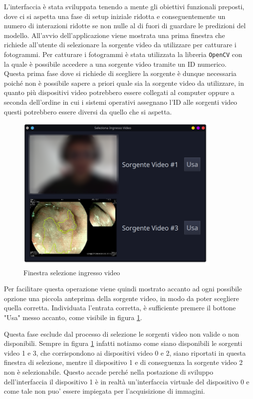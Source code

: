 L'interfaccia è stata sviluppata tenendo a mente gli obiettivi
funzionali preposti, dove ci si aspetta una fase di 
setup iniziale ridotta e conseguentemente un numero di interazioni
ridotte se non nulle al di fuori di guardare le predizioni
del modello.
All'avvio dell'applicazione viene mostrata una prima finestra
che richiede all'utente di selezionare la sorgente video
da utilizzare per catturare i fotogrammi.
Per catturare i fotogrammi è stata utilizzata la libreria
{\tt OpenCV} con la quale è possibile accedere a una sorgente
video tramite un ID numerico.
Questa prima fase dove si richiede di scegliere la sorgente
è dunque necessaria poiché non è possibile sapere a priori
quale sia la sorgente video da utilizzare, in quanto
più dispositivi video potrebbero essere collegati al computer
oppure a seconda dell'ordine in cui i sistemi operativi
assegnano l'ID alle sorgenti video questi potrebbero
essere diversi da quello che si aspetta.

\begin{figure}[H]
    \includegraphics[width=0.9\textwidth]{./assets/app-splashscreen.png}
    \caption{\label{fig:app-splashscreen} Finestra selezione ingresso video}
\end{figure}

Per facilitare questa operazione viene quindi mostrato
accanto ad ogni possibile opzione una piccola anteprima
della sorgente video, in modo da poter scegliere quella
corretta.
Individuata l'entrata corretta, è sufficiente premere il
bottone "Usa" messo accanto, come visibile in 
figura \ref{fig:app-splashscreen}.

Questa fase esclude dal processo di selezione le sorgenti video
non valide o non disponibili.
Sempre in figura \ref{fig:app-splashscreen} infatti notiamo come
siano disponibili le sorgenti video 1 e 3, che corrispondono
ai dispositivi video 0 e 2, siano riportati in questa
finestra di selezione, mentre il dispositivo 1 e di conseguenza
la sorgente video 2 non è selezionabile.
Questo accade perché nella postazione di sviluppo dell'interfaccia
il dispositivo 1 è in realtà un'interfaccia virtuale del
dispositivo 0 e come tale non puo' essere impiegata per
l'acquisizione di immagini.

